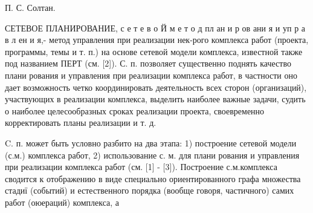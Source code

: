 \documentclass[10pt]{article}
\begin{document}
П. С. Солтан.



СЕТЕВОЕ ПЛАНИРОВАНИЕ, с е т е в о Й м е т $о$ д пл ан и р ов ани я и уп р а в л ен и я,- метод управления при реализации нек-рого комплекса работ (проекта, программы, темы и т. п.) на основе сетевой модели комплекса, известной также под названием ПЕРТ (см. [2]). С. п. позволяет существенно поднять качество плани рования и управления при реализации комплекса работ, в частности оно дает возможность четко координировать деятельность всех сторон (организаций), участвующих в реализации комплекса, выделить наиболее важные задачи, судить о наиболее целесообразных сроках реализации проекта, своевременно корректировать планы реализации и т. д.



C. п. может быть условно разбито на два этапа: 1) построение сетевой модели (с.м.) комплекса работ, 2) использование с. м. для плани рования и управления при реализации комплекса работ (см. [1] - [3]). Построение с.м.комплекса сводится к отображению в виде специально ориентированного графа множества стадиї (событий) и естественного порядка (вообще говоря, частичного) самих работ (оюераций) комплекса, а
\end{document}
